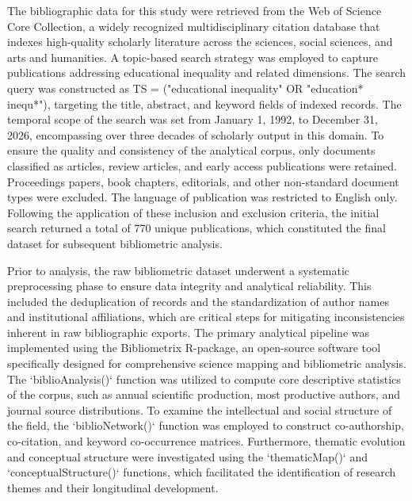 \documentclass[12pt,a4paper]{article}
\begin{document}
The bibliographic data for this study were retrieved from the Web of Science Core Collection, a widely recognized multidisciplinary citation database that indexes high-quality scholarly literature across the sciences, social sciences, and arts and humanities. A topic-based search strategy was employed to capture publications addressing educational inequality and related dimensions. The search query was constructed as TS = ("educational inequality" OR "education* inequ*"), targeting the title, abstract, and keyword fields of indexed records. The temporal scope of the search was set from January 1, 1992, to December 31, 2026, encompassing over three decades of scholarly output in this domain. To ensure the quality and consistency of the analytical corpus, only documents classified as articles, review articles, and early access publications were retained. Proceedings papers, book chapters, editorials, and other non-standard document types were excluded. The language of publication was restricted to English only. Following the application of these inclusion and exclusion criteria, the initial search returned a total of 770 unique publications, which constituted the final dataset for subsequent bibliometric analysis.

Prior to analysis, the raw bibliometric dataset underwent a systematic preprocessing phase to ensure data integrity and analytical reliability. This included the deduplication of records and the standardization of author names and institutional affiliations, which are critical steps for mitigating inconsistencies inherent in raw bibliographic exports. The primary analytical pipeline was implemented using the Bibliometrix R-package, an open-source software tool specifically designed for comprehensive science mapping and bibliometric analysis. The `biblioAnalysis()` function was utilized to compute core descriptive statistics of the corpus, such as annual scientific production, most productive authors, and journal source distributions. To examine the intellectual and social structure of the field, the `biblioNetwork()` function was employed to construct co-authorship, co-citation, and keyword co-occurrence matrices. Furthermore, thematic evolution and conceptual structure were investigated using the `thematicMap()` and `conceptualStructure()` functions, which facilitated the identification of research themes and their longitudinal development.
\end{document}
